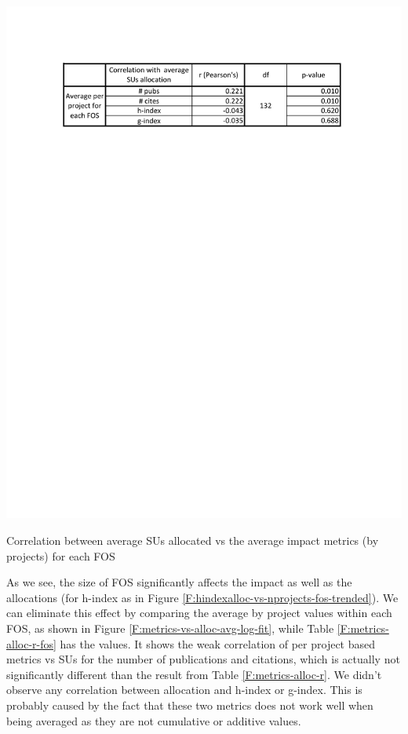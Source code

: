 \documentclass{sig-alternate}
\begin{document}
\begin{table}[!htb] 
  \centering 
    \includegraphics[width=1.0\columnwidth]{images/metrics_alloc_r_fos.pdf} 
  \caption{Correlation between average SUs allocated vs the average impact metrics (by projects) for each FOS}\label{F:metrics-alloc-r-fos} 
\end{table} 
 
As we see, the size of FOS significantly affects the impact as well as the allocations (for h-index as in Figure \ref{F:hindexalloc-vs-nprojects-fos-trended}). We can eliminate this effect by comparing the average by project values within each FOS, as shown in Figure \ref{F:metrics-vs-alloc-avg-log-fit}, while Table \ref{F:metrics-alloc-r-fos} has the values. It shows the weak correlation of per project based metrics vs SUs for the number of publications and citations, which is actually not significantly different than the result from Table \ref{F:metrics-alloc-r}. We didn't observe any correlation between allocation and h-index or g-index. This is probably caused by the fact that these two metrics does not work well when being averaged as they are not cumulative or additive values. 
 
\end{document}
